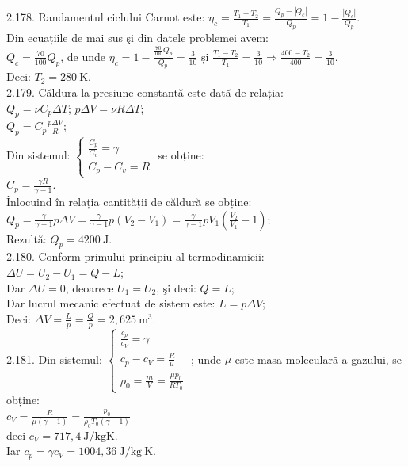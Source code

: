 2.178. Randamentul ciclului Carnot este: $\eta_{c}=\frac{T_{1}-T_{2}}{T_{1}}=\frac{Q_{p}-\left|Q_{c}\right|}{Q_{p}}=1-\frac{\left|Q_{c}\right|}{Q_{p}}$.\\ Din ecuațiile de mai sus şi din datele problemei avem:\\ $Q_{c}=\frac{70}{100} Q_{p}$, de unde $\eta_{c}=1-\frac{\frac{70}{100} Q_{p}}{Q_{p}}=\frac{3}{10}$ și $\frac{T_{1}-T_{2}}{T_{1}}=\frac{3}{10} \Rightarrow \frac{400-T_{2}}{400}=\frac{3}{10}$.\\ Deci: $T_{2}=280 \mathrm{~K}$.\\

2.179. Căldura la presiune constantă este dată de relația:\\ $Q_{p}=\nu C_{p} \Delta T$; \quad $p \Delta V=\nu R \Delta T$;\\ $Q_{p}=C_{p} \frac{p \Delta V}{R}$;\\ Din sistemul: $\left\{\begin{array}{l} \frac{C_{p}}{C_{v}}=\gamma\\ C_{p}-C_{v}=R \end{array}\right.$ \quad se obține:\\ $C_{p}=\frac{\gamma R}{\gamma-1}$.\\ Înlocuind în relația cantității de căldură se obține: $Q_{p}=\frac{\gamma}{\gamma-1} p \Delta V=\frac{\gamma}{\gamma-1} p\left(V_{2}-V_{1}\right)=\frac{\gamma}{\gamma-1} p V_{1}\left(\frac{V_{2}}{V_{1}}-1\right)$;\\ Rezultă: $Q_{p}=4200 \mathrm{~J}$.\\

2.180. Conform primului principiu al termodinamicii:\\ $\Delta U=U_{2}-U_{1}=Q-L$;\\ Dar $\Delta U=0$, deoarece $U_{1}=U_{2}$, şi deci: $Q=L$;\\ Dar lucrul mecanic efectuat de sistem este: $L=p \Delta V$;\\ Deci: $\Delta V=\frac{L}{p}=\frac{Q}{p}=2,625 \mathrm{~m}^{3}$.\\

2.181. Din sistemul: $\left\{\begin{array}{l}\frac{c_{p}}{c_{V}}=\gamma \\ c_{p}-c_{V}=\frac{R}{\mu} \quad  \\ \rho_{0}=\frac{m}{V}=\frac{\mu p_{0}}{R T_{0}}\end{array}\right.$; unde $\mu$ este masa moleculară a gazului, se obține:\\ $c_{V}=\frac{R}{\mu(\gamma-1)}=\frac{p_{0}}{\rho_{0} T_{0}(\gamma-1)}$\\ deci $c_{V}=717,4 \mathrm{~J} / \mathrm{kg} \mathrm{K}$.\\ Iar $c_{p}=\gamma c_{V}=1004,36 \mathrm{~J} / \mathrm{kg} \mathrm{~K}$.\\

